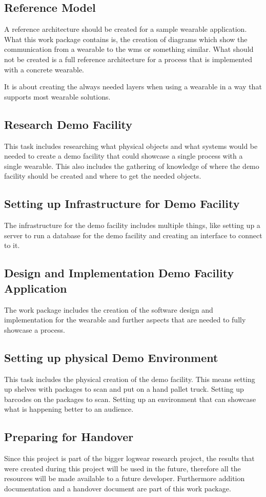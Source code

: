 \subsection{Reference Model}
A reference architecture should be created for a sample wearable application. What this work package contains is, the creation of diagrams which show the communication from a wearable to the \gls{wms} or something similar. What should not be created is a full reference architecture for a process that is implemented with a concrete wearable. 

It is about creating the always needed layers when using a wearable in a way that supports most wearable solutions.

\subsection{Research Demo Facility}
This task includes researching what physical objects and what systems would be needed to create a demo facility that could showcase a single process with a single wearable. This also includes the gathering of knowledge of where the demo facility should be created and where to get the needed objects.

\subsection{Setting up Infrastructure for Demo Facility}
The infrastructure for the demo facility includes multiple things, like setting up a server to run a database for the demo facility and creating an interface to connect to it. 

\subsection{Design and Implementation Demo Facility Application}
The work package includes the creation of the software design and implementation for the wearable and further aspects that are needed to fully showcase a process.

\subsection{Setting up physical Demo Environment}
This task includes the physical creation of the demo facility. This means setting up shelves with packages to scan and put on a hand pallet truck. Setting up barcodes on the packages to scan. Setting up an environment that can showcase what is happening better to an audience.

\subsection{Preparing for Handover}
Since this project is part of the bigger logwear research project, the results that were created during this project will be used in the future, therefore all the resources will be made available to a future developer. Furthermore addition documentation and a handover document are part of this work package.
